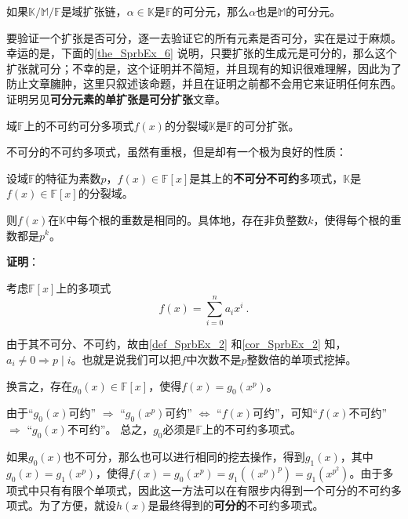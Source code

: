 \begin{lemma}{}\label{lem_SprbEx_3}
如果$\mathbb{K}/\mathbb{M}/\mathbb{F}$是域扩张链，$\alpha\in\mathbb{K}$是$\mathbb{F}$的可分元，那么$\alpha$也是$\mathbb{M}$的可分元。
\end{lemma}


要验证一个扩张是否可分，逐一去验证它的所有元素是否可分，实在是过于麻烦。幸运的是，下面的\autoref{the_SprbEx_6} 说明，只要扩张的生成元是可分的，那么这个扩张就可分；不幸的是，这个证明并不简短，并且现有的知识很难理解，因此为了防止文章臃肿，这里只叙述该命题，并且在证明之前都不会用它来证明任何东西。证明另见\textbf{可分元素的单扩张是可分扩张}文章。

\begin{theorem}{}\label{the_SprbEx_6}
域$\mathbb{F}$上的不可约可分多项式$f(x)$的分裂域$\mathbb{K}$是$\mathbb{F}$的可分扩张。
\end{theorem}



不可分的不可约多项式，虽然有重根，但是却有一个极为良好的性质：


\begin{theorem}{}\label{the_SprbEx_3}
设域$\mathbb{F}$的特征为素数$p$，$f(x)\in\mathbb{F}[x]$是其上的\textbf{不可分不可约}多项式，$\mathbb{K}$是$f(x)\in\mathbb{F}[x]$的分裂域。

则$f(x)$在$\mathbb{K}$中每个根的重数是相同的。具体地，存在非负整数$k$，使得每个根的重数都是$p^k$。
\end{theorem}

\textbf{证明}：

考虑$\mathbb{F}[x]$上的多项式
\begin{equation}
f(x) = \sum_{i=0}^n a_ix^i~.
\end{equation}


由于其不可分、不可约，故由\autoref{def_SprbEx_2} 和\autoref{cor_SprbEx_2} 知，$a_i\neq 0 \Rightarrow p\mid i$。也就是说我们可以把$f$中次数不是$p$整数倍的单项式挖掉。

换言之，存在$g_0(x)\in\mathbb{F}[x]$，使得$f(x)=g_0(x^p)$。

由于“$g_0(x)$可约” $\Rightarrow$ “$g_0(x^p)$可约” $\iff$ “$f(x)$可约”，可知“$f(x)$不可约” $\Rightarrow$ “$g_0(x)$不可约”。 总之，$g_0$必须是$\mathbb{F}$上的不可约多项式。

如果$g_0(x)$也不可分，那么也可以进行相同的挖去操作，得到$g_1(x)$，其中$g_0(x) = g_1(x^p)$，使得$f(x) = g_0(x^p) = g_1((x^p)^p) = g_1(x^{p^2})$。由于多项式中只有有限个单项式，因此这一方法可以在有限步内得到一个可分的不可约多项式。为了方便，就设$h(x)$是最终得到的\textbf{可分的}不可约多项式。

